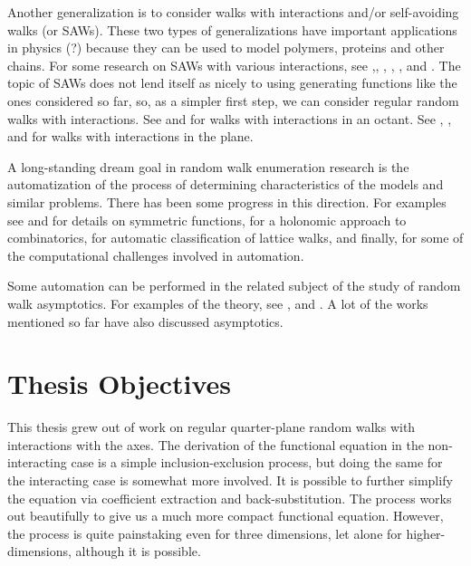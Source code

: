 Another generalization is to consider walks with interactions and/or self-avoiding walks (or SAWs). These two types of generalizations have important applications in physics (?) because they can be used to model polymers, proteins and other chains. For some research on SAWs with various interactions, see \cite{van2004multiple},\cite{brak2009self}, \cite{wong2014confining}, \cite{chan2012monte}, \cite{bacher2011weakly}, \cite{bedini2014lattice} and \cite{dagrosa2015writhe}. The topic of SAWs does not lend itself as nicely to using generating functions like the ones considered so far, so, as a simpler first step, we can consider regular random walks with interactions. See \cite{niederhausen2005random} and \cite{niederhausen2005note} for walks with interactions in an octant. See \cite{brak2005directed}, \cite{owczarek2012enumeration}, and \cite{tabbara2014exact} for walks with interactions in the plane.

A long-standing dream goal in random walk enumeration research is the automatization of the process of determining characteristics of the models and similar problems. There has been some progress in this direction. For examples see \cite{gessel1990symmetric} and \cite{chyzak2005effective} for details on symmetric functions, \cite{mishna2005holonomic} for a holonomic approach to combinatorics, \cite{bostan2009automatic} for automatic classification of lattice walks, and finally, \cite{kauers2011computational} for some of the computational challenges involved in automation.

Some automation can be performed in the related subject of the study of random walk asymptotics. For examples of the theory, see \cite{johnson2013towards}, \cite{melczer2014asymptotic} and \cite{melczer2014enumerating}. A lot of the works mentioned so far have also discussed asymptotics.

\section{Thesis Objectives}

This thesis grew out of work on regular quarter-plane random walks with interactions with the axes. The derivation of the functional equation in the non-interacting case is a simple inclusion-exclusion process, but doing the same for the interacting case is somewhat more involved. It is possible to further simplify the equation via coefficient extraction and back-substitution. The process works out beautifully to give us a much more compact functional equation. However, the process is quite painstaking even for three dimensions, let alone for higher-dimensions, although it is possible. 

